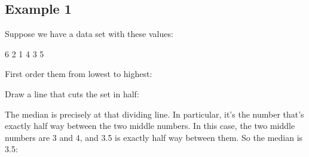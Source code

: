 \documentclass[../../../main.tex]{subfiles}
\begin{document}
\subsection{Example 1} 

Suppose we have a data set with these values:

\begin{center}
  6 2 1 4 3 5
\end{center}

\noindent
First order them from lowest to highest:

\begin{center}
\end{center}

\noindent
Draw a line that cuts the set in half:

\begin{center}
\end{center}

\noindent
The median is precisely at that dividing line. In particular, it's the number that's exactly half way between the two middle numbers. In this case, the two middle numbers are 3 and 4, and 3.5 is exactly half way between them. So the median is 3.5:

\begin{center}
\end{center}
\end{document}
